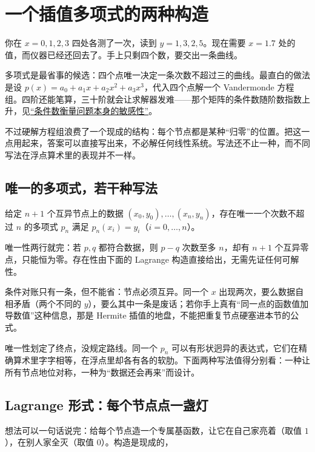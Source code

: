 \section{一个插值多项式的两种构造}
\label{sec:08-Numerical-Analysis/03-Interpolation-and-Approximation/01}

你在 \(x=0,1,2,3\) 四处各测了一次，读到 \(y=1,3,2,5\)。现在需要 \(x=1.7\) 处的值，而仪器已经还回去了。手上只剩四个数，要交出一条曲线。

多项式是最省事的候选：四个点唯一决定一条次数不超过三的曲线。最直白的做法是设 \(p(x)=a_0+a_1x+a_2x^2+a_3x^3\)，代入四个点解一个 Vandermonde 方程组。四阶还能笔算，三十阶就会让求解器发难——那个矩阵的条件数随阶数指数上升，见\hyperref[sec:08-Numerical-Analysis/01-Floating-Point-and-Error/03]{``条件数衡量问题本身的敏感性''}。

不过硬解方程组浪费了一个现成的结构：每个节点都是某种``归零''的位置。把这一点用起来，答案可以直接写出来，不必解任何线性系统。写法还不止一种，而不同写法在浮点算术里的表现并不一样。

\subsection{唯一的多项式，若干种写法}

\begin{theorem}
给定 \(n+1\) 个互异节点上的数据 \((x_0,y_0),\dots,(x_n,y_n)\)，存在唯一一个次数不超过 \(n\) 的多项式 \(p_n\) 满足 \(p_n(x_i)=y_i\)（\(i=0,\dots,n\)）。
\end{theorem}

唯一性两行就完：若 \(p,q\) 都符合数据，则 \(p-q\) 次数至多 \(n\)，却有 \(n+1\) 个互异零点，只能恒为零。存在性由下面的 Lagrange 构造直接给出，无需先证任何可解性。

条件对账只有一条，但不能省：节点必须互异。同一个 \(x\) 出现两次，要么数据自相矛盾（两个不同的 \(y\)），要么其中一条是废话；若你手上真有``同一点的函数值加导数值''这种信息，那是 Hermite 插值的地盘，不能把重复节点硬塞进本节的公式。

唯一性划定了终点，没规定路线。同一个 \(p_n\) 可以有形状迥异的表达式，它们在精确算术里字字相等，在浮点里却各有各的软肋。下面两种写法值得分别看：一种让所有节点地位对称，一种为``数据还会再来''而设计。

\subsection{Lagrange 形式：每个节点点一盏灯}

想法可以一句话说完：给每个节点造一个专属基函数，让它在自己家亮着（取值 \(1\)），在别人家全灭（取值 \(0\)）。构造是现成的，

